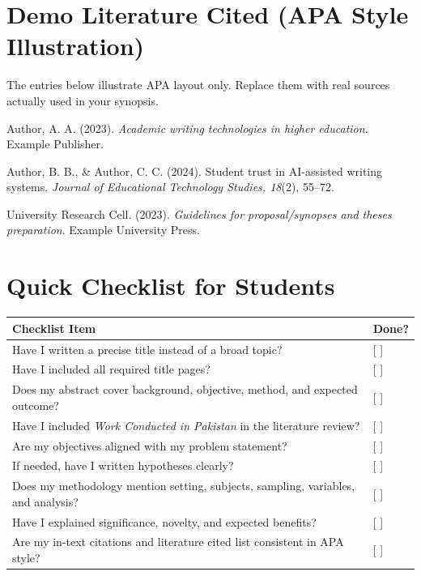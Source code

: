 \documentclass[11pt,a4paper]{article}
\begin{document}
\section{Demo Literature Cited (APA Style Illustration)}

\begin{examplebox}
The entries below illustrate APA layout only. Replace them with real sources actually used in your synopsis.

Author, A. A. (2023). \emph{Academic writing technologies in higher education}. Example Publisher.

Author, B. B., \& Author, C. C. (2024). Student trust in AI-assisted writing systems. \emph{Journal of Educational Technology Studies, 18}(2), 55--72.

University Research Cell. (2023). \emph{Guidelines for proposal/synopses and theses preparation}. Example University Press.
\end{examplebox}

\section{Quick Checklist for Students}

\begin{longtable}{L{9.5cm}C{2cm}}
\toprule
\textbf{Checklist Item} & \textbf{Done?} \\
\midrule
Have I written a precise title instead of a broad topic? & [ ] \\
Have I included all required title pages? & [ ] \\
Does my abstract cover background, objective, method, and expected outcome? & [ ] \\
Have I included \emph{Work Conducted in Pakistan} in the literature review? & [ ] \\
Are my objectives aligned with my problem statement? & [ ] \\
If needed, have I written hypotheses clearly? & [ ] \\
Does my methodology mention setting, subjects, sampling, variables, and analysis? & [ ] \\
Have I explained significance, novelty, and expected benefits? & [ ] \\
Are my in-text citations and literature cited list consistent in APA style? & [ ] \\
\bottomrule
\end{longtable}
\end{document}

